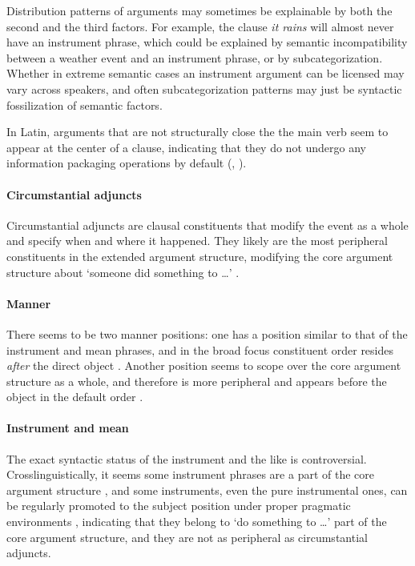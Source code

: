 \documentclass[a4paper, oneside, 12pt]{report}
\newcommand*{\citepage}[1]{p.~{#1}}
\newcommand*{\citepages}[1]{pp.~{#1}}
\newcommand{\form}[1]{\emph{#1}}
\newcommand{\translate}[1]{`#1'}
\begin{document}
Distribution patterns of arguments may sometimes be explainable
by both the second and the third factors. 
For example, the clause \form{it rains} will almost never have an instrument phrase,
which could be explained by semantic incompatibility between
a weather event and an instrument phrase,
or by subcategorization. 
Whether in extreme semantic cases an instrument argument can be licensed
may vary across speakers,
and often subcategorization patterns may just be syntactic fossilization of semantic factors. 

In Latin, arguments that are not structurally close the the main verb
seem to appear at the center of a clause,
indicating that they do not undergo any information packaging operations by default 
(, ).

\paragraph*{Circumstantial adjuncts}
Circumstantial adjuncts are clausal constituents that
modify the event as a whole and specify when and where it happened.
They likely are the most peripheral constituents in the extended argument structure,
modifying the core argument structure about \translate{someone did something to \dots}
\citep[\citepage{29}]{cinque1999adverbs}.

\paragraph*{Manner}
There seems to be two manner positions:
one has a position similar to that of the instrument and mean phrases,
and in the broad focus constituent order resides \emph{after} the direct object
\citep[\citepage{71-75}]{devine2006latin}.
Another position seems to scope over the core argument structure as a whole,
and therefore is more peripheral and appears before the object
in the default order
\cite[\citepages{101-109}]{devine2006latin}. 

\paragraph*{Instrument and mean}
\label{sec:grammatical.clause.peripheral.instrument}
The exact syntactic status of the instrument and the like is controversial.
Crosslinguistically, it seems some instrument phrases are a part of the core argument structure
\citep{pascual2001syntactic},
and some instruments, even the pure instrumental ones, 
can be regularly promoted to the subject position
under proper pragmatic environments \citep{alexiadou2008instrument},
indicating that they belong to \translate{do something to \dots} part of the core argument structure,
and they are not as peripheral as circumstantial adjuncts. 
\end{document}
